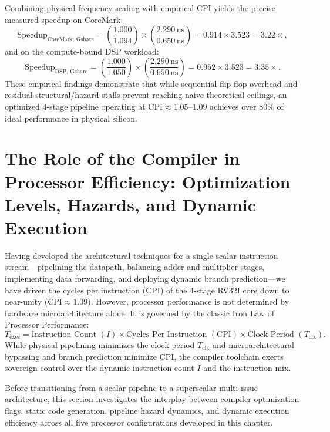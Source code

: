 Combining physical frequency scaling with empirical CPI yields the precise measured speedup on CoreMark:
\begin{equation}
\text{Speedup}_{\text{CoreMark, Gshare}} = \left(\frac{1.000}{1.094}\right) \times \left(\frac{2.290\,\text{ns}}{0.650\,\text{ns}}\right) = 0.914 \times 3.523 = \mathbf{3.22\times},
\end{equation}
and on the compute-bound DSP workload:
\begin{equation}
\text{Speedup}_{\text{DSP, Gshare}} = \left(\frac{1.000}{1.050}\right) \times \left(\frac{2.290\,\text{ns}}{0.650\,\text{ns}}\right) = 0.952 \times 3.523 = \mathbf{3.35\times}.
\end{equation}
These empirical findings demonstrate that while sequential flip-flop overhead and residual structural/hazard stalls prevent reaching naive theoretical ceilings, an optimized 4-stage pipeline operating at $\text{CPI} \approx 1.05\text{--}1.09$ achieves over $80\%$ of ideal performance in physical silicon.


\section{The Role of the Compiler in Processor Efficiency: Optimization Levels, Hazards, and Dynamic Execution}\label{riscvCompilerStudy}

Having developed the architectural techniques for a single scalar instruction stream---pipelining the datapath, balancing adder and multiplier stages, implementing data forwarding, and deploying dynamic branch prediction---we have driven the cycles per instruction (CPI) of the 4-stage RV32I core down to near-unity ($\text{CPI} \approx 1.09$). However, processor performance is not determined by hardware microarchitecture alone. It is governed by the classic Iron Law of Processor Performance:
\begin{equation}
T_{\text{exec}} = \text{Instruction Count } (I) \times \text{Cycles Per Instruction } (\text{CPI}) \times \text{Clock Period } (T_{\text{clk}}).
\end{equation}
While physical pipelining minimizes the clock period $T_{\text{clk}}$ and microarchitectural bypassing and branch prediction minimize $\text{CPI}$, the compiler toolchain exerts sovereign control over the dynamic instruction count $I$ and the instruction mix. 

Before transitioning from a scalar pipeline to a superscalar multi-issue architecture, this section investigates the interplay between compiler optimization flags, static code generation, pipeline hazard dynamics, and dynamic execution efficiency across all five processor configurations developed in this chapter.

